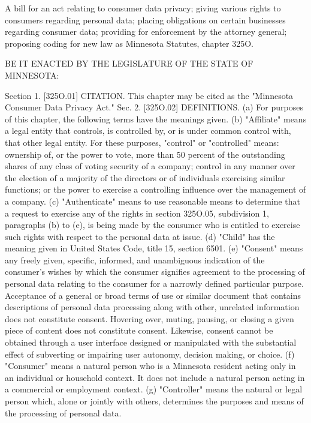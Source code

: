 A bill for an act
relating to consumer data privacy; giving various rights to consumers regarding
personal data; placing obligations on certain businesses regarding consumer data;
providing for enforcement by the attorney general; proposing coding for new law
as Minnesota Statutes, chapter 325O.

BE IT ENACTED BY THE LEGISLATURE OF THE STATE OF MINNESOTA:

Section 1. [325O.01] CITATION.
This chapter may be cited as the "Minnesota Consumer Data Privacy Act."
Sec. 2. [325O.02] DEFINITIONS.
(a) For purposes of this chapter, the following terms have the meanings given.
(b) "Affiliate" means a legal entity that controls, is controlled by, or is under common
control with, that other legal entity. For these purposes, "control" or "controlled" means:
ownership of, or the power to vote, more than 50 percent of the outstanding shares of any
class of voting security of a company; control in any manner over the election of a majority
of the directors or of individuals exercising similar functions; or the power to exercise a
controlling influence over the management of a company.
(c) "Authenticate" means to use reasonable means to determine that a request to exercise
any of the rights in section 325O.05, subdivision 1, paragraphs (b) to (e), is being made by
the consumer who is entitled to exercise such rights with respect to the personal data at
issue.
(d) "Child" has the meaning given in United States Code, title 15, section 6501.
(e) "Consent" means any freely given, specific, informed, and unambiguous indication
of the consumer's wishes by which the consumer signifies agreement to the processing of
personal data relating to the consumer for a narrowly defined particular purpose. Acceptance
of a general or broad terms of use or similar document that contains descriptions of personal
data processing along with other, unrelated information does not constitute consent. Hovering
over, muting, pausing, or closing a given piece of content does not constitute consent.
Likewise, consent cannot be obtained through a user interface designed or manipulated with
the substantial effect of subverting or impairing user autonomy, decision making, or choice.
(f) "Consumer" means a natural person who is a Minnesota resident acting only in an
individual or household context. It does not include a natural person acting in a commercial
or employment context.
(g) "Controller" means the natural or legal person which, alone or jointly with others,
determines the purposes and means of the processing of personal data.
